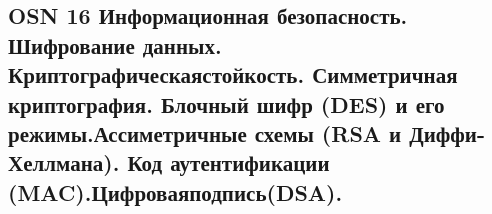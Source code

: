 \subsection{OSN 16 Информационная безопасность. Шифрование данных.
Криптографическаястойкость. Симметричная криптография. Блочный шифр
(DES) и его режимы.Ассиметричные схемы (RSA и Диффи-Хеллмана). Код
аутентификации (MAC).Цифроваяподпись(DSA).}

